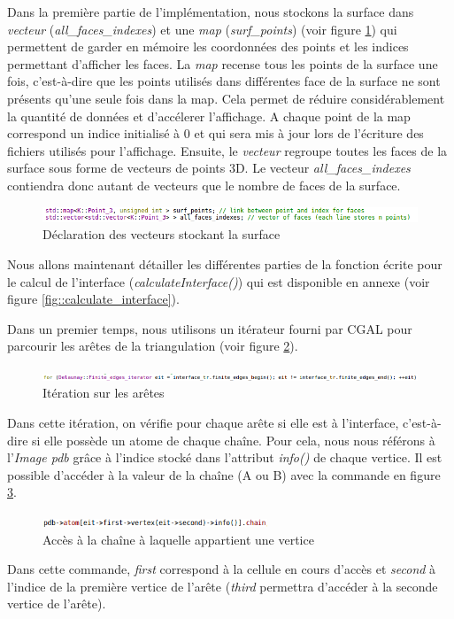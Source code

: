 Dans la première partie de l'implémentation, nous stockons la surface dans \textit{vecteur}
(\textit{all\_faces\_indexes})
et une \textit{map} (\textit{surf\_points}) (voir figure \ref{fig::init_surf_vector})
qui permettent de garder en mémoire les coordonnées des points
et les indices permettant d'afficher les faces. La \textit{map} recense tous les points
de la surface une fois, c'est-à-dire que les points utilisés dans différentes face de la surface
ne sont présents qu'une seule fois dans la map. Cela permet de réduire considérablement
la quantité de données et d'accélerer l'affichage. A chaque point de la map correspond
un indice initialisé à 0 et qui sera mis à jour lors de l'écriture des fichiers utilisés
pour l'affichage. Ensuite, le \textit{vecteur} regroupe toutes les faces de la surface
sous forme de vecteurs de points 3D. Le vecteur \textit{all\_faces\_indexes} contiendra
donc autant de vecteurs que le nombre de faces de la surface.


\begin{figure}[ht]
\centering
  \includegraphics[width=\textwidth]{figures/init_surf_vect.png}
  \caption{Déclaration des vecteurs stockant la surface}
  \label{fig::init_surf_vector}
\end{figure}

Nous allons maintenant détailler les différentes parties de la fonction écrite pour
le calcul de l'interface (\textit{calculateInterface()}) qui est disponible en
annexe (voir figure \ref{fig::calculate_interface}).

Dans un premier temps, nous utilisons un itérateur fourni par CGAL pour parcourir
les arêtes de la triangulation (voir figure \ref{fig::iter_edges}).
\begin{figure}[ht]
\centering
  \includegraphics[width=\textwidth]{figures/iter_edges.png}
  \caption{Itération sur les arêtes}
  \label{fig::iter_edges}
\end{figure}
Dans cette itération, on vérifie pour chaque arête si elle est à l'interface, c'est-à-dire
si elle possède un atome de chaque chaîne. Pour cela, nous nous référons à l'\textit{Image pdb}
grâce à l'indice stocké dans l'attribut \textit{info()} de chaque vertice. Il est possible
d'accéder à la valeur de la chaîne (A ou B) avec la commande en figure \ref{fig::access_chain}.
\begin{figure}[ht]
\centering
  \includegraphics[width=0.6\textwidth]{figures/access_chain.png}
  \caption{Accès à la chaîne à laquelle appartient une vertice}
  \label{fig::access_chain}
\end{figure}
Dans cette commande, \textit{first} correspond à la cellule en cours d'accès et
\textit{second} à l'indice de la première vertice de l'arête (\textit{third} permettra
d'accéder à la seconde vertice de l'arête).

